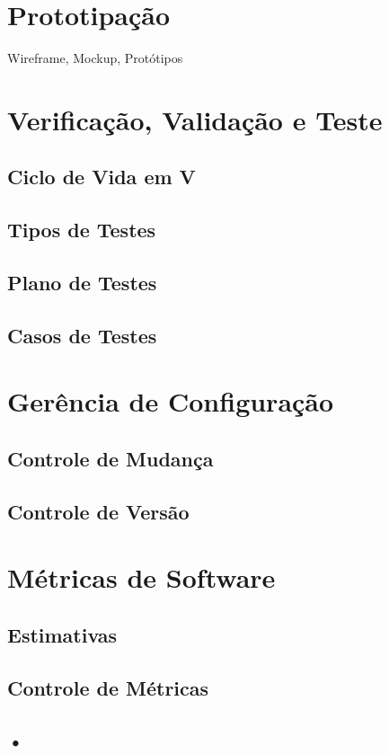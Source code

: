 \documentclass[ ]{article}
\begin{document}
	\section{Prototipação}
		Wireframe, Mockup, Protótipos
	\section{Verificação, Validação e Teste}
		\subsection{Ciclo de Vida em V}
		\subsection{Tipos de Testes}
		\subsection{Plano de Testes}
		\subsection{Casos de Testes}
	\section{Gerência de Configuração}
		\subsection{Controle de Mudança}
		\subsection{Controle de Versão} %
	\section{Métricas de Software}
		\subsection{Estimativas}
		\subsection{Controle de Métricas}
		\subsection{•}%
\end{document}
